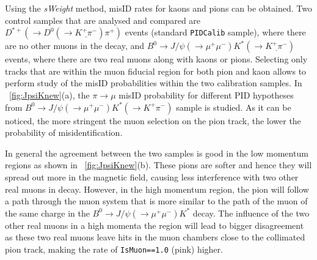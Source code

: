 Using the \textit{sWeight} method, misID rates for kaons and pions can be obtained. Two control samples that are analysed and compared are $D^{*+}(\rightarrow D^{0}(\rightarrow \underline{K^{+} \pi^{-}}) \pi^{+})$ events (standard \texttt{PIDCalib} sample), where there are no other muons in the decay, and $B^{0} \rightarrow J/\psi(\rightarrow \mu^{+} \mu^{-}) K^{*}(\rightarrow \underline{K^{+}\pi^{-}})$ events, where there are two real muons along with kaons or pions. Selecting only tracks that are within the muon fiducial region for both pion and kaon allows to perform study of the misID probabilities within the two calibration samples. In ~\autoref{fig:JpsiKnew}(a), the $\pi \rightarrow \mu$ misID probability for different \gls{PID} hypotheses from $B^{0} \rightarrow J/\psi(\rightarrow \mu^{+} \mu^{-}) K^{*}(\rightarrow K^{+}\pi^{-})$ sample is studied. As it can be noticed, the more stringent the muon selection on the pion track, the lower the probability of misidentification.

In general the agreement between the two samples is good in the low momentum regions as shown in ~\autoref{fig:JpsiKnew}(b). These pions are softer and hence they will spread out more in the magnetic field, causing less interference with two other real muons in decay. However, in the high momentum region, the pion will follow a path through the muon system that is more similar to the path of the muon of the same charge in the $B^{0} \rightarrow J/\psi(\rightarrow \mu^{+} \mu^{-}) K^{*}$ decay. The influence of the two other real muons in a high momenta the region will lead to bigger disagreement as these two real muons leave hits in the muon chambers close to the collimated pion track, making the rate of \texttt{IsMuon==1.0} (pink) higher. 






